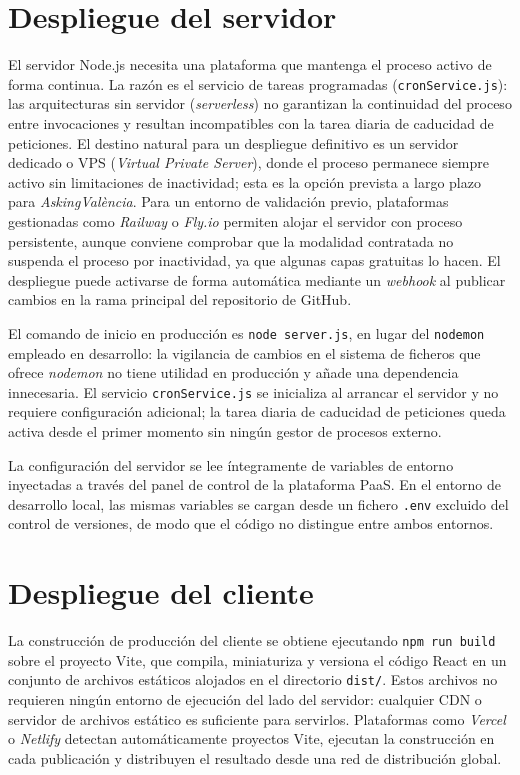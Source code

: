 \documentclass[11pt,oneside,spanish,listoffigures,listoftables]{tfgetsinf}
\begin{document}
\section{Despliegue del servidor}

El servidor Node.js necesita una plataforma que mantenga el proceso activo de forma continua. La razón es el servicio de tareas programadas (\texttt{cronService.js}): las arquitecturas sin servidor (\textit{serverless}) no garantizan la continuidad del proceso entre invocaciones y resultan incompatibles con la tarea diaria de caducidad de peticiones. El destino natural para un despliegue definitivo es un servidor dedicado o VPS (\textit{Virtual Private Server}), donde el proceso permanece siempre activo sin limitaciones de inactividad; esta es la opción prevista a largo plazo para \textit{AskingValència}. Para un entorno de validación previo, plataformas gestionadas como \textit{Railway} o \textit{Fly.io} permiten alojar el servidor con proceso persistente, aunque conviene comprobar que la modalidad contratada no suspenda el proceso por inactividad, ya que algunas capas gratuitas lo hacen. El despliegue puede activarse de forma automática mediante un \textit{webhook} al publicar cambios en la rama principal del repositorio de GitHub.

El comando de inicio en producción es \texttt{node server.js}, en lugar del \texttt{nodemon} empleado en desarrollo: la vigilancia de cambios en el sistema de ficheros que ofrece \textit{nodemon} no tiene utilidad en producción y añade una dependencia innecesaria. El servicio \texttt{cronService.js} se inicializa al arrancar el servidor y no requiere configuración adicional; la tarea diaria de caducidad de peticiones queda activa desde el primer momento sin ningún gestor de procesos externo.

La configuración del servidor se lee íntegramente de variables de entorno inyectadas a través del panel de control de la plataforma PaaS. En el entorno de desarrollo local, las mismas variables se cargan desde un fichero \texttt{.env} excluido del control de versiones, de modo que el código no distingue entre ambos entornos.

\section{Despliegue del cliente}

La construcción de producción del cliente se obtiene ejecutando \texttt{npm run build} sobre el proyecto Vite, que compila, miniaturiza y versiona el código React en un conjunto de archivos estáticos alojados en el directorio \texttt{dist/}. Estos archivos no requieren ningún entorno de ejecución del lado del servidor: cualquier CDN o servidor de archivos estático es suficiente para servirlos. Plataformas como \textit{Vercel} o \textit{Netlify} detectan automáticamente proyectos Vite, ejecutan la construcción en cada publicación y distribuyen el resultado desde una red de distribución global.
\end{document}
